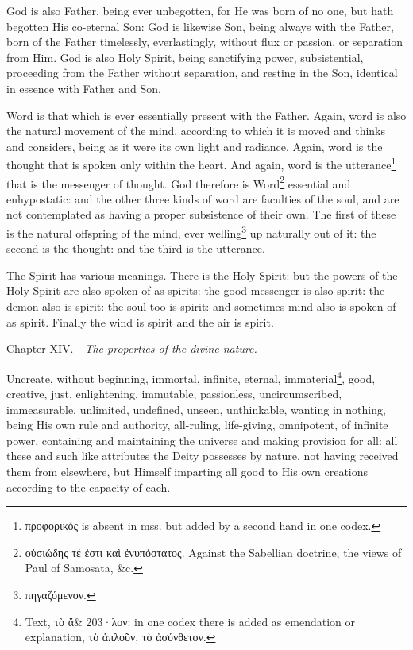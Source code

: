 God is also Father, being ever unbegotten, for He was born of no one, but hath begotten His co-eternal Son: God is likewise Son, being always with the Father, born of the Father timelessly, everlastingly, without flux or passion, or separation from Him. God is also Holy Spirit, being sanctifying power, subsistential, proceeding from the Father without separation, and resting in the Son, identical in essence with Father and Son.

Word is that which is ever essentially present with the Father. Again, word is also the natural movement of the mind, according to which it is moved and thinks and considers, being as it were its own light and radiance. Again, word is the thought that is spoken only within the heart. And again, word is the utterance\footnote{\textgreek{προφορικός} is absent in mss. but added by a second hand in one codex.} that is the messenger of thought. God therefore is Word\footnote{\textgreek{οὐσιώδης τέ ἐστι καὶ ἐνυπόστατος}. Against the Sabellian doctrine, the views of Paul of Samosata, \&c.} essential and enhypostatic: and the other three kinds of word are faculties of the soul, and are not contemplated as having a proper subsistence of their own. The first of these is the natural offspring of the mind, ever welling\footnote{\textgreek{πηγαζόμενον}.} up naturally out of it: the second is the thought: and the third is the utterance.

The Spirit has various meanings. There is the Holy Spirit: but the powers of the Holy Spirit are also spoken of as spirits: the good messenger is also spirit: the demon also is spirit: the soul too is spirit: and sometimes mind also is spoken of as spirit. Finally the wind is spirit and the air is spirit.


Chapter XIV.—\emph{The properties of the divine nature.}

Uncreate, without beginning, immortal, infinite, eternal, immaterial\footnote{Text, \textgreek{τὸ ἄ\& 203·λον}: in one codex there is added as emendation or explanation, \textgreek{τὸ ἁπλοῦν, τὸ ἀσύνθετον}.}, good, creative, just, enlightening, immutable, passionless, uncircumscribed, immeasurable, unlimited, undefined, unseen, unthinkable, wanting in nothing, being His own rule and authority, all-ruling, life-giving, omnipotent, of infinite power, containing and maintaining the universe and making provision for all: all these and such like attributes the Deity possesses by nature, not having received them from elsewhere, but Himself imparting all good to His own creations according to the capacity of each.


